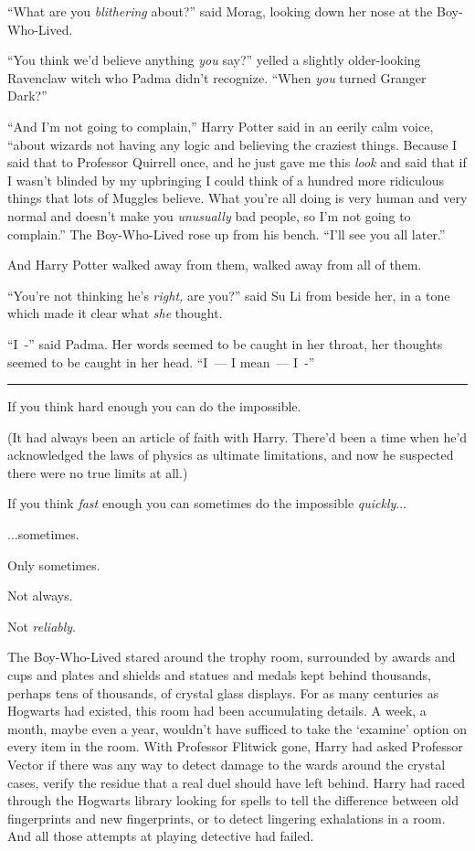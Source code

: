 ``What are you \emph{blithering} about?'' said Morag, looking down her nose at the Boy-Who-Lived.

``You think we'd believe anything \emph{you} say?'' yelled a slightly older-looking Ravenclaw witch who Padma didn't recognize. ``When \emph{you} turned Granger Dark?''

``And I'm not going to complain,'' Harry Potter said in an eerily calm voice, ``about wizards not having any logic and believing the craziest things. Because I said that to Professor Quirrell once, and he just gave me this \emph{look} and said that if I wasn't blinded by my upbringing I could think of a hundred more ridiculous things that lots of Muggles believe. What you're all doing is very human and very normal and doesn't make you \emph{unusually} bad people, so I'm not going to complain.'' The Boy-Who-Lived rose up from his bench. ``I'll see you all later.''

And Harry Potter walked away from them, walked away from all of them.

``You're not thinking he's \emph{right,} are you?'' said Su Li from beside her, in a tone which made it clear what \emph{she} thought.

``I~-'' said Padma. Her words seemed to be caught in her throat, her thoughts seemed to be caught in her head. ``I~--- I mean~--- I~-''

\begin{center}\rule{3in}{0.4pt}\end{center}

If you think hard enough you can do the impossible.

(It had always been an article of faith with Harry. There'd been a time when he'd acknowledged the laws of physics as ultimate limitations, and now he suspected there were no true limits at all.)

If you think \emph{fast} enough you can sometimes do the impossible \emph{quickly}...

...sometimes.

Only sometimes.

Not always.

Not \emph{reliably}.

The Boy-Who-Lived stared around the trophy room, surrounded by awards and cups and plates and shields and statues and medals kept behind thousands, perhaps tens of thousands, of crystal glass displays. For as many centuries as Hogwarts had existed, this room had been accumulating details. A week, a month, maybe even a year, wouldn't have sufficed to take the `examine' option on every item in the room. With Professor Flitwick gone, Harry had asked Professor Vector if there was any way to detect damage to the wards around the crystal cases, verify the residue that a real duel should have left behind. Harry had raced through the Hogwarts library looking for spells to tell the difference between old fingerprints and new fingerprints, or to detect lingering exhalations in a room. And all those attempts at playing detective had failed.

